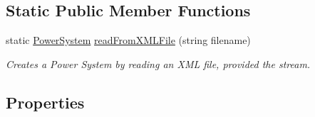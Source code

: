 \subsection*{Static Public Member Functions}
\begin{DoxyCompactItemize}
\item 
static \hyperlink{class_power_system_planning_1_1_power_system}{Power\+System} \hyperlink{class_power_system_planning_1_1_power_system_a6e4503f2559b1073a140555ecd6093b0}{read\+From\+X\+M\+L\+File} (string filename)
\begin{DoxyCompactList}\small\item\em Creates a Power System by reading an X\+ML file, provided the stream. \end{DoxyCompactList}\end{DoxyCompactItemize}
\subsection*{Properties}
